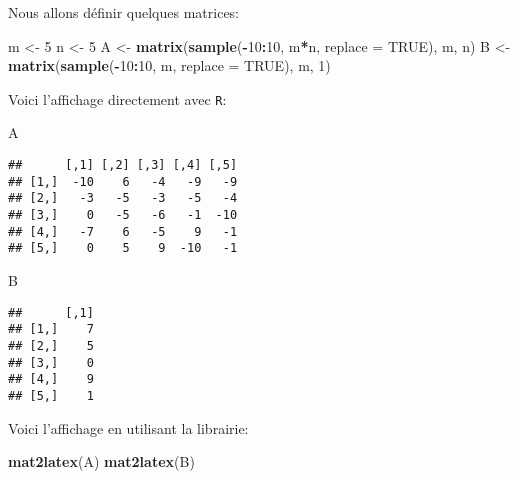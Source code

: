 \documentclass[]{article}
\newenvironment{Shaded}{\begin{snugshade}}{\end{snugshade}}
\newcommand{\DataTypeTok}[1]{\textcolor[rgb]{0.13,0.29,0.53}{#1}}
\newcommand{\DecValTok}[1]{\textcolor[rgb]{0.00,0.00,0.81}{#1}}
\newcommand{\KeywordTok}[1]{\textcolor[rgb]{0.13,0.29,0.53}{\textbf{#1}}}
\newcommand{\NormalTok}[1]{#1}
\newcommand{\OperatorTok}[1]{\textcolor[rgb]{0.81,0.36,0.00}{\textbf{#1}}}
\newcommand{\OtherTok}[1]{\textcolor[rgb]{0.56,0.35,0.01}{#1}}
\newcommand{\StringTok}[1]{\textcolor[rgb]{0.31,0.60,0.02}{#1}}
\begin{document}
Nous allons définir quelques matrices:

\begin{Shaded}
\begin{Highlighting}[]
\NormalTok{m <-}\StringTok{ }\DecValTok{5}
\NormalTok{n <-}\StringTok{ }\DecValTok{5}
\NormalTok{A <-}\StringTok{ }\KeywordTok{matrix}\NormalTok{(}\KeywordTok{sample}\NormalTok{(}\OperatorTok{-}\DecValTok{10}\OperatorTok{:}\DecValTok{10}\NormalTok{, m}\OperatorTok{*}\NormalTok{n, }\DataTypeTok{replace =} \OtherTok{TRUE}\NormalTok{), m, n)}
\NormalTok{B <-}\StringTok{ }\KeywordTok{matrix}\NormalTok{(}\KeywordTok{sample}\NormalTok{(}\OperatorTok{-}\DecValTok{10}\OperatorTok{:}\DecValTok{10}\NormalTok{, m, }\DataTypeTok{replace =} \OtherTok{TRUE}\NormalTok{), m, }\DecValTok{1}\NormalTok{)}
\end{Highlighting}
\end{Shaded}

Voici l'affichage directement avec \texttt{R}:

\begin{Shaded}
\begin{Highlighting}[]
\NormalTok{A}
\end{Highlighting}
\end{Shaded}

\begin{verbatim}
##      [,1] [,2] [,3] [,4] [,5]
## [1,]  -10    6   -4   -9   -9
## [2,]   -3   -5   -3   -5   -4
## [3,]    0   -5   -6   -1  -10
## [4,]   -7    6   -5    9   -1
## [5,]    0    5    9  -10   -1
\end{verbatim}

\begin{Shaded}
\begin{Highlighting}[]
\NormalTok{B}
\end{Highlighting}
\end{Shaded}

\begin{verbatim}
##      [,1]
## [1,]    7
## [2,]    5
## [3,]    0
## [4,]    9
## [5,]    1
\end{verbatim}

Voici l'affichage en utilisant la librairie:

\begin{Shaded}
\begin{Highlighting}[]
\KeywordTok{mat2latex}\NormalTok{(A)}
\KeywordTok{mat2latex}\NormalTok{(B)}
\end{Highlighting}
\end{Shaded}
\end{document}

